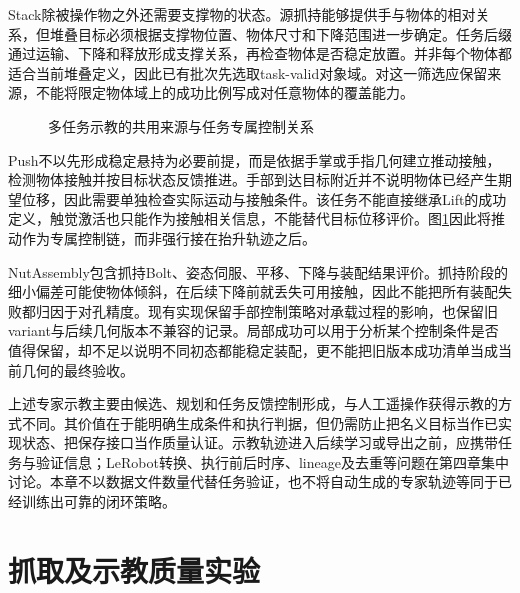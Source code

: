 Stack除被操作物之外还需要支撑物的状态。源抓持能够提供手与物体的相对关系，但堆叠目标必须根据支撑物位置、物体尺寸和下降范围进一步确定。任务后缀通过运输、下降和释放形成支撑关系，再检查物体是否稳定放置。并非每个物体都适合当前堆叠定义，因此已有批次先选取task-valid对象域。对这一筛选应保留来源，不能将限定物体域上的成功比例写成对任意物体的覆盖能力。

\begin{figure}[htbp]
 \centering
 \caption{多任务示教的共用来源与任务专属控制关系}
 \label{fig:ch03_task_transfer}
\end{figure}

Push不以先形成稳定悬持为必要前提，而是依据手掌或手指几何建立推动接触，检测物体接触并按目标状态反馈推进。手部到达目标附近并不说明物体已经产生期望位移，因此需要单独检查实际运动与接触条件。该任务不能直接继承Lift的成功定义，触觉激活也只能作为接触相关信息，不能替代目标位移评价。图\ref{fig:ch03_task_transfer}因此将推动作为专属控制链，而非强行接在抬升轨迹之后。

NutAssembly包含抓持Bolt、姿态伺服、平移、下降与装配结果评价。抓持阶段的细小偏差可能使物体倾斜，在后续下降前就丢失可用接触，因此不能把所有装配失败都归因于对孔精度。现有实现保留手部控制策略对承载过程的影响，也保留旧variant与后续几何版本不兼容的记录。局部成功可以用于分析某个控制条件是否值得保留，却不足以说明不同初态都能稳定装配，更不能把旧版本成功清单当成当前几何的最终验收。

上述专家示教主要由候选、规划和任务反馈控制形成，与人工遥操作获得示教的方式不同\cite{mandlekar2022demonstrations,mandlekar2023mimicgen}。其价值在于能明确生成条件和执行判据，但仍需防止把名义目标当作已实现状态、把保存接口当作质量认证。示教轨迹进入后续学习或导出之前，应携带任务与验证信息；LeRobot转换、执行前后时序、lineage及去重等问题在第四章集中讨论。本章不以数据文件数量代替任务验证，也不将自动生成的专家轨迹等同于已经训练出可靠的闭环策略。

\section{抓取及示教质量实验}
\label{sec:grasp_quality_experiments}

